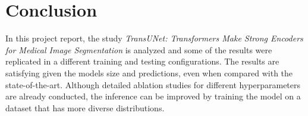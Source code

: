 \documentclass{IEEEtran}
\begin{document}
\section{Conclusion}

In this project report, the study \textit{TransUNet: Transformers Make Strong Encoders for Medical Image Segmentation} is analyzed and some of the results were replicated in a different training and testing configurations. The results are satisfying given the models size and predictions, even when compared with the state-of-the-art. Although detailed ablation studies for different hyperparameters are already conducted, the inference can be improved by training the model on a dataset that has more diverse distributions. 

\vfill\null\newpage
\printbibliography{}
\end{document}
